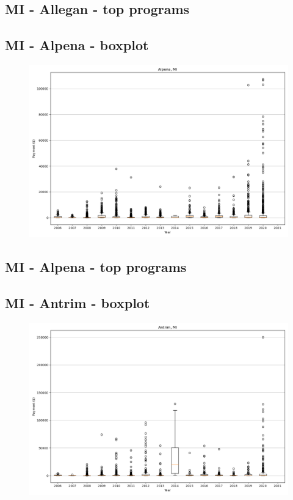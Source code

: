 \subsection*{MI - Allegan - top programs}

\newpage
\subsection*{MI - Alpena - boxplot}
\begin{figure}[h]
\centering
\includegraphics[width=7in]{../output/boxplots/counties/Alpena-MI_boxplot.png}
\end{figure}


\subsection*{MI - Alpena - top programs}

\newpage
\subsection*{MI - Antrim - boxplot}
\begin{figure}[h]
\centering
\includegraphics[width=7in]{../output/boxplots/counties/Antrim-MI_boxplot.png}
\end{figure}


